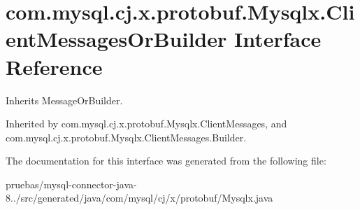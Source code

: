 \hypertarget{interfacecom_1_1mysql_1_1cj_1_1x_1_1protobuf_1_1_mysqlx_1_1_client_messages_or_builder}{}\section{com.\+mysql.\+cj.\+x.\+protobuf.\+Mysqlx.\+Client\+Messages\+Or\+Builder Interface Reference}
\label{interfacecom_1_1mysql_1_1cj_1_1x_1_1protobuf_1_1_mysqlx_1_1_client_messages_or_builder}


Inherits Message\+Or\+Builder.



Inherited by com.\+mysql.\+cj.\+x.\+protobuf.\+Mysqlx.\+Client\+Messages, and com.\+mysql.\+cj.\+x.\+protobuf.\+Mysqlx.\+Client\+Messages.\+Builder.



The documentation for this interface was generated from the following file\+:\begin{DoxyCompactItemize}
\item 
pruebas/mysql-\/connector-\/java-\/8../src/generated/java/com/mysql/cj/x/protobuf/Mysqlx.\+java\end{DoxyCompactItemize}
